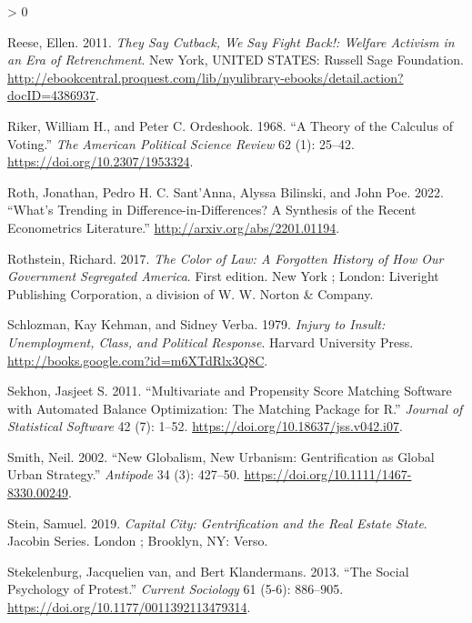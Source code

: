 \documentclass[
  12pt,
]{article}
\newlength{\cslhangindent}
\newenvironment{CSLReferences}[2] %
 {%
  \setlength{\parindent}{0pt}
  \ifodd #1 \everypar{\setlength{\hangindent}{\cslhangindent}}\ignorespaces\fi
  \ifnum #2 > 0
  \setlength{\parskip}{#2\baselineskip}
  \fi
 }%
 {}
\begin{document}
\begin{CSLReferences}{1}{0}
\leavevmode\hypertarget{ref-Reese2011}{}%
Reese, Ellen. 2011. \emph{They {Say Cutback}, {We Say Fight Back}!: {Welfare Activism} in an {Era} of {Retrenchment}}. {New York, UNITED STATES}: {Russell Sage Foundation}. \url{http://ebookcentral.proquest.com/lib/nyulibrary-ebooks/detail.action?docID=4386937}.

\leavevmode\hypertarget{ref-Riker1968}{}%
Riker, William H., and Peter C. Ordeshook. 1968. {``A {Theory} of the {Calculus} of {Voting}.''} \emph{The American Political Science Review} 62 (1): 25--42. \url{https://doi.org/10.2307/1953324}.

\leavevmode\hypertarget{ref-Roth2022}{}%
Roth, Jonathan, Pedro H. C. Sant'Anna, Alyssa Bilinski, and John Poe. 2022. {``What's {Trending} in {Difference-in-Differences}? {A Synthesis} of the {Recent Econometrics Literature}.''} \url{http://arxiv.org/abs/2201.01194}.

\leavevmode\hypertarget{ref-Rothstein2017}{}%
Rothstein, Richard. 2017. \emph{The Color of Law: A Forgotten History of How Our Government Segregated {America}}. First edition. {New York ; London}: {Liveright Publishing Corporation, a division of W. W. Norton \& Company}.

\leavevmode\hypertarget{ref-Schlozman1979}{}%
Schlozman, Kay Kehman, and Sidney Verba. 1979. \emph{Injury to {Insult}: {Unemployment}, {Class}, and {Political Response}}. {Harvard University Press}. \url{http://books.google.com?id=m6XTdRlx3Q8C}.

\leavevmode\hypertarget{ref-Sekhon2011}{}%
Sekhon, Jasjeet S. 2011. {``Multivariate and {Propensity Score Matching Software} with {Automated Balance Optimization}: {The Matching} Package for {R}.''} \emph{Journal of Statistical Software} 42 (7): 1--52. \url{https://doi.org/10.18637/jss.v042.i07}.

\leavevmode\hypertarget{ref-Smith2002}{}%
Smith, Neil. 2002. {``New {Globalism}, {New Urbanism}: {Gentrification} as {Global Urban Strategy}.''} \emph{Antipode} 34 (3): 427--50. \url{https://doi.org/10.1111/1467-8330.00249}.

\leavevmode\hypertarget{ref-Stein2019}{}%
Stein, Samuel. 2019. \emph{Capital City: Gentrification and the Real Estate State}. Jacobin Series. {London ; Brooklyn, NY}: {Verso}.

\leavevmode\hypertarget{ref-vanStekelenburg2013}{}%
Stekelenburg, Jacquelien van, and Bert Klandermans. 2013. {``The Social Psychology of Protest.''} \emph{Current Sociology} 61 (5-6): 886--905. \url{https://doi.org/10.1177/0011392113479314}.


\end{CSLReferences}
\end{document}
